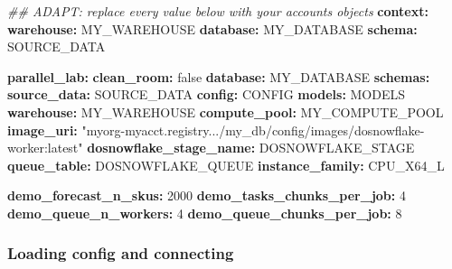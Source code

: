 \documentclass[
]{article}
\newenvironment{Shaded}{\begin{snugshade}}{\end{snugshade}}
\newcommand{\AttributeTok}[1]{\textcolor[rgb]{0.13,0.29,0.53}{#1}}
\newcommand{\CharTok}[1]{\textcolor[rgb]{0.31,0.60,0.02}{#1}}
\newcommand{\CommentTok}[1]{\textcolor[rgb]{0.56,0.35,0.01}{\textit{#1}}}
\newcommand{\DecValTok}[1]{\textcolor[rgb]{0.00,0.00,0.81}{#1}}
\newcommand{\FunctionTok}[1]{\textcolor[rgb]{0.13,0.29,0.53}{\textbf{#1}}}
\newcommand{\KeywordTok}[1]{\textcolor[rgb]{0.13,0.29,0.53}{\textbf{#1}}}
\newcommand{\StringTok}[1]{\textcolor[rgb]{0.31,0.60,0.02}{#1}}
\begin{document}
\begin{Shaded}
\begin{Highlighting}[]
\CommentTok{\#\# ADAPT: replace every value below with your account\textquotesingle{}s objects}
\FunctionTok{context}\KeywordTok{:}
\AttributeTok{  }\FunctionTok{warehouse}\KeywordTok{:}\AttributeTok{ MY\_WAREHOUSE}
\AttributeTok{  }\FunctionTok{database}\KeywordTok{:}\AttributeTok{  MY\_DATABASE}
\AttributeTok{  }\FunctionTok{schema}\KeywordTok{:}\AttributeTok{    SOURCE\_DATA}

\FunctionTok{parallel\_lab}\KeywordTok{:}
\AttributeTok{  }\FunctionTok{clean\_room}\KeywordTok{:}\AttributeTok{ }\CharTok{false}
\AttributeTok{  }\FunctionTok{database}\KeywordTok{:}\AttributeTok{  MY\_DATABASE}
\AttributeTok{  }\FunctionTok{schemas}\KeywordTok{:}
\AttributeTok{    }\FunctionTok{source\_data}\KeywordTok{:}\AttributeTok{ SOURCE\_DATA}
\AttributeTok{    }\FunctionTok{config}\KeywordTok{:}\AttributeTok{      CONFIG}
\AttributeTok{    }\FunctionTok{models}\KeywordTok{:}\AttributeTok{      MODELS}
\AttributeTok{  }\FunctionTok{warehouse}\KeywordTok{:}\AttributeTok{     MY\_WAREHOUSE}
\AttributeTok{  }\FunctionTok{compute\_pool}\KeywordTok{:}\AttributeTok{  MY\_COMPUTE\_POOL}
\AttributeTok{  }\FunctionTok{image\_uri}\KeywordTok{:}\AttributeTok{     }\StringTok{"myorg{-}myacct.registry.../my\_db/config/images/dosnowflake{-}worker:latest"}
\AttributeTok{  }\FunctionTok{dosnowflake\_stage\_name}\KeywordTok{:}\AttributeTok{ DOSNOWFLAKE\_STAGE}
\AttributeTok{  }\FunctionTok{queue\_table}\KeywordTok{:}\AttributeTok{ DOSNOWFLAKE\_QUEUE}
\AttributeTok{  }\FunctionTok{instance\_family}\KeywordTok{:}\AttributeTok{ CPU\_X64\_L}

\AttributeTok{  }\FunctionTok{demo\_forecast\_n\_skus}\KeywordTok{:}\AttributeTok{ }\DecValTok{2000}
\AttributeTok{  }\FunctionTok{demo\_tasks\_chunks\_per\_job}\KeywordTok{:}\AttributeTok{ }\DecValTok{4}
\AttributeTok{  }\FunctionTok{demo\_queue\_n\_workers}\KeywordTok{:}\AttributeTok{ }\DecValTok{4}
\AttributeTok{  }\FunctionTok{demo\_queue\_chunks\_per\_job}\KeywordTok{:}\AttributeTok{ }\DecValTok{8}
\end{Highlighting}
\end{Shaded}

\subsubsection{Loading config and
connecting}\label{loading-config-and-connecting}
\end{document}
